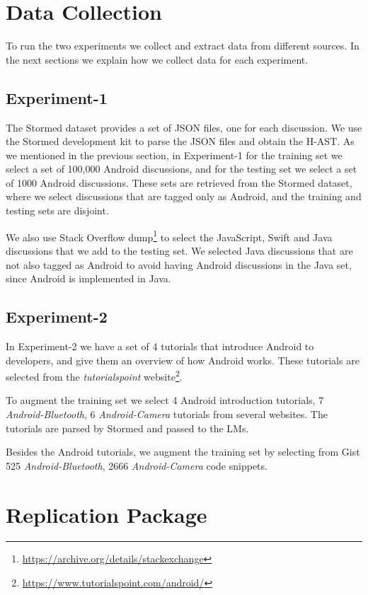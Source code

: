 \documentclass[12pt,mscthesis]{usiinfthesis}
\begin{document}
{	\section{Data Collection}	

	To run the two experiments we collect and extract data from different sources. In the next sections we explain how we collect data for each experiment.

	\subsection{Experiment-1}

	The Stormed dataset provides a set of JSON files, one for each discussion. We use the Stormed development kit to parse the JSON files and obtain the H-AST.
	As we mentioned in the previous section, in Experiment-1 for the training set we select a set of 100,000 Android discussions, and for the testing set we select a set of 1000 Android discussions. These sets are retrieved from the Stormed dataset, where we select discussions that are tagged only as Android, and the training and testing sets are disjoint.

	We also use Stack Overflow dump\footnote{\url{https://archive.org/details/stackexchange}} to select the JavaScript, Swift and Java discussions that we add to the testing set. We selected Java discussions that are not also tagged as Android to avoid having Android discussions in the Java set, since Android is implemented in Java.

	\subsection{Experiment-2}
	
	In Experiment-2 we have a set of 4 tutorials that introduce Android to developers, and give them an overview of how Android works. These tutorials are  selected from the \emph{tutorialspoint} website\footnote{\url{https://www.tutorialspoint.com/android/}}. 

	To augment the training set we select 4 Android introduction tutorials, 7 \emph{Android-Bluetooth}, 6 \emph{Android-Camera} tutorials from several websites. The tutorials are parsed by Stormed and passed to the LMs.  

	Besides the Android tutorials, we augment the training set by selecting from Gist 525 \emph{Android-Bluetooth}, 2666 \emph{Android-Camera} code snippets.

 	\section{Replication Package}

}
\end{document}
